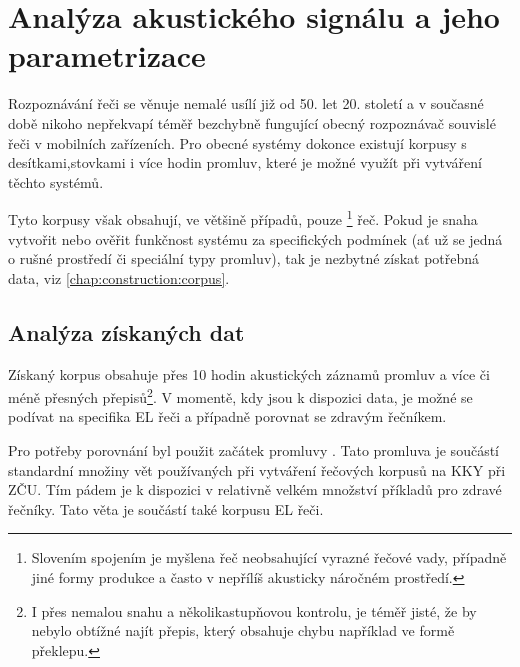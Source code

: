 \section{Analýza akustického signálu a jeho parametrizace}
\label{chap:construction:analysis}

Rozpoznávání řeči se věnuje nemalé usílí již od 50. let 20. století a v současné době nikoho nepřekvapí téměř bezchybně fungující obecný rozpoznávač souvislé řeči v mobilních zařízeních. Pro obecné systémy dokonce existují korpusy s desítkami,stovkami i více hodin promluv, které je možné využít při vytváření těchto systémů.

Tyto korpusy však obsahují, ve většině případů, pouze \footnote{Slovením spojením  je myšlena řeč neobsahující vyrazné řečové vady, případně jiné formy produkce a často v nepřílíš akusticky náročném prostředí.} řeč. Pokud je snaha vytvořit nebo ověřit funkčnost systému za specifických podmínek (ať už se jedná o rušné prostředí či speciální typy promluv), tak je nezbytné získat potřebná data, viz \ref{chap:construction:corpus}.

\subsection{Analýza získaných dat}
\label{chap:construction:analysis:data}

Získaný korpus obsahuje přes 10 hodin akustických záznamů promluv a více či méně přesných přepisů\footnote{I přes nemalou snahu a několikastupňovou kontrolu, je téměř jisté, že by nebylo obtížné najít přepis, který obsahuje chybu například ve formě překlepu.}. V momentě, kdy jsou k dispozici data, je možné se podívat na specifika EL řeči a případně porovnat se zdravým řečníkem.

Pro potřeby porovnání byl použit začátek promluvy \textit{}. Tato promluva je součástí standardní množiny vět používaných při vytváření řečových korpusů na KKY při ZČU. Tím pádem je k dispozici v relativně velkém množství příkladů pro zdravé řečníky. Tato věta je součástí také korpusu EL řeči.

